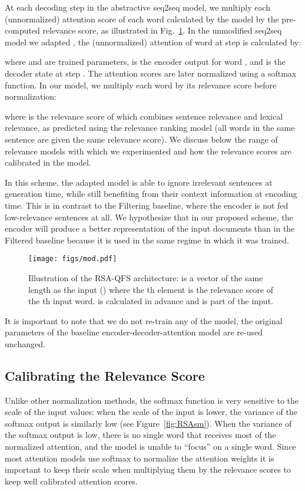 \documentclass[11pt,a4paper]{article}
\begin{document}
At each decoding step in the abstractive seq2seq model, we multiply each (unnormalized) attention score of each word calculated by the model by the pre-computed relevance score, as illustrated in Fig.~\ref{fig:RSAmod}. In the unmodified seq2seq model we adapted \cite{DBLP:journals/corr/SeeLM17}, the (unnormalized) attention of word  at step  is calculated by: 



where  and  are trained parameters,  is the encoder output for word , and  is the decoder state at step . The attention scores are later normalized using a softmax function. In our model, we multiply each word by its relevance score before normalization: 

where  is the relevance score of  which combines sentence relevance and lexical relevance, as predicted using the relevance ranking model (all words in the same sentence are given the same relevance score).  We discuss below the range of relevance models with which we experimented and how the relevance scores are calibrated in the model.

In this scheme, the adapted model is able to ignore irrelevant sentences at generation time, while still benefiting from their context information at encoding time.  This is in contrast to the Filtering baseline, where the encoder is not fed low-relevance sentences at all.   We hypothesize that in our proposed scheme, the encoder will produce a better representation of the input documents than in the Filtered baseline because it is used in the same regime in which it was trained.

\begin{figure}
  \centering 
  \texttt{[image: figs/mod.pdf]} 
  \caption{Illustration of the RSA-QFS architecture:  is a vector of the same length as the input () where the th element is the relevance score of the th input word.  is calculated in advance and is part of the input.}\label{fig:RSAmod} 
\end{figure} 

It is important to note that we do not re-train any of the model, the original parameters of the baseline encoder-decoder-attention model are re-used unchanged.  

\subsection{Calibrating the Relevance Score}
Unlike other normalization methods, the softmax function is very sensitive to the scale of the input values: when the scale of the input is lower, the variance of the softmax output is similarly low (see Figure~\ref{fig:RSAsm}). When the variance of the softmax output is low, there is no single word that receives most of the normalized attention, and the model is unable to ``focus'' on a single word. Since most attention models use softmax to normalize the attention weights it is important to keep their scale when multiplying them by the relevance scores to keep well calibrated attention scores.
\end{document}
